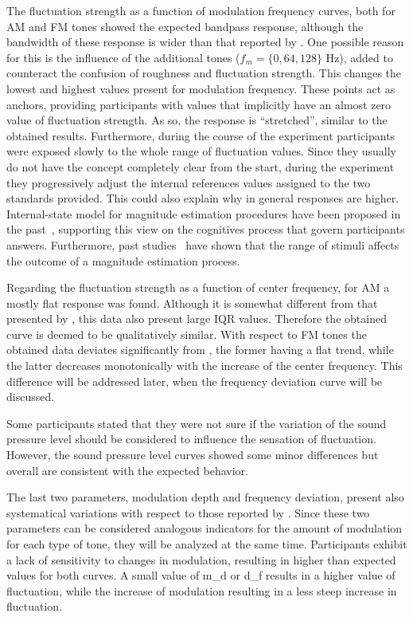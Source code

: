 \documentclass[../main.tex]{subfiles}
\begin{document}
The fluctuation strength as a function of modulation frequency curves, both for
\gls{AM} and \gls{FM} tones showed the expected bandpass response, although
the bandwidth of these response is wider than that reported by
\citeauthor{Fastl2007Psychoacoustics}. One possible reason for this is the
influence of the additional tones ($f_m = \{0, 64, 128\}$ Hz), added to
counteract the confusion of roughness and fluctuation strength. This changes
the lowest and highest values present for modulation frequency. These points
act as anchors, providing participants with values that implicitly have an
almost zero value of fluctuation strength. As so, the response is ``stretched'',
similar to the obtained results. Furthermore, during the course of the
experiment participants were exposed slowly to the whole range of fluctuation
values. Since they usually do not have the concept completely clear from the
start, during the experiment they progressively adjust the internal references
values assigned to the two standards provided. This could also explain why in
general responses are higher. Internal-state model for magnitude estimation
procedures have been proposed in the past~\cite{Marley1972}, supporting this
view on the cognitives process that govern participants answers. Furthermore,
past studies~\cite{Teghtsoonian1978} have shown that the range of stimuli
affects the outcome of a magnitude estimation process.

Regarding the fluctuation strength as a function of center frequency, for
\gls{AM} a mostly flat response was found. Although it is somewhat different
from that presented by \citeauthor{Fastl2007Psychoacoustics}, this data also
present large \gls{IQR} values. Therefore the obtained curve is deemed to be
qualitatively similar. With respect to \gls{FM} tones the obtained data
deviates significantly from \citeauthor{Fastl2007Psychoacoustics}, the former
having a flat trend, while the latter decreases monotonically with the increase
of the center frequency. This difference will be addressed later, when the
frequency deviation curve will be discussed.

Some participants stated that they were not sure if the variation of the
sound pressure level should be considered to influence the sensation of
fluctuation. However, the sound pressure level curves showed some minor
differences but overall are consistent with the expected behavior.

The last two parameters, modulation depth and frequency deviation, present also
systematical variations with respect to those reported by
\citeauthor{Fastl2007Psychoacoustics}. Since these two parameters can be
considered analogous indicators for the amount of modulation for each type of
tone, they will be analyzed at the same time. Participants exhibit a lack of
sensitivity to changes in modulation, resulting in higher than expected values
for both curves. A small value of \gls{m_d} or \gls{d_f} results in a higher
value of fluctuation, while the increase of modulation resulting in a less
steep increase in fluctuation.
\end{document}

